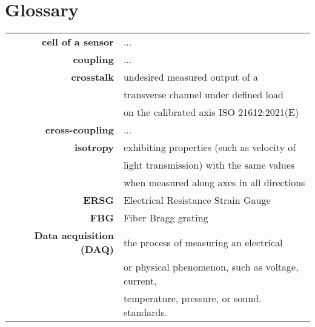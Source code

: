 \chapter{Glossary}
\label{chapter:glossaries}

\begin{tabular}{>{\bfseries}r l}
    cell of a sensor & ...\\
    coupling & ... \\
    crosstalk & undesired measured output of a\\
     &transverse channel under defined load \\
     &on the calibrated axis ISO 21612:2021(E) \\
    cross-coupling & ... \\
    isotropy & exhibiting properties (such as velocity of \\
    &light transmission) with the same values \\
    &when measured along axes in all directions \cite{isotropic}\\
    ERSG & Electrical Resistance Strain Gauge\\
    FBG & Fiber Bragg grating\\
    Data acquisition (DAQ) & the process of measuring an electrical\\
    & or physical phenomenon, such as voltage, current, \\
    & temperature, pressure, or sound. 
standards.
\end{tabular}




